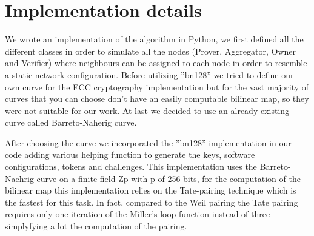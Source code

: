 \section{Implementation details}



We wrote an implementation of the algorithm in Python, we first defined all the different classes in order to simulate all the nodes (Prover, Aggregator, Owner and Verifier) where neighbours can be assigned to each node in order to resemble a static network configuration.
Before utilizing ''bn128'' we tried to define our own curve for the ECC cryptography implementation but for the vast majority of curves that you can choose don't have an easily computable bilinear map, so they were not suitable for our work. At last we decided to use an already existing curve called Barreto-Naherig curve.

After choosing the curve we incorporated the ''bn128'' implementation in our code adding various helping function to generate the keys, software configurations, tokens and challenges.
This implementation uses the Barreto-Naehrig curve on a finite field Zp with p of 256 bits, for the computation of the bilinear map this implementation relies on the Tate-pairing technique which is the fastest for this task. In fact, compared to the Weil pairing the Tate pairing requires only one iteration of the Miller's loop function instead of three simplyfying a lot the computation of the pairing.

